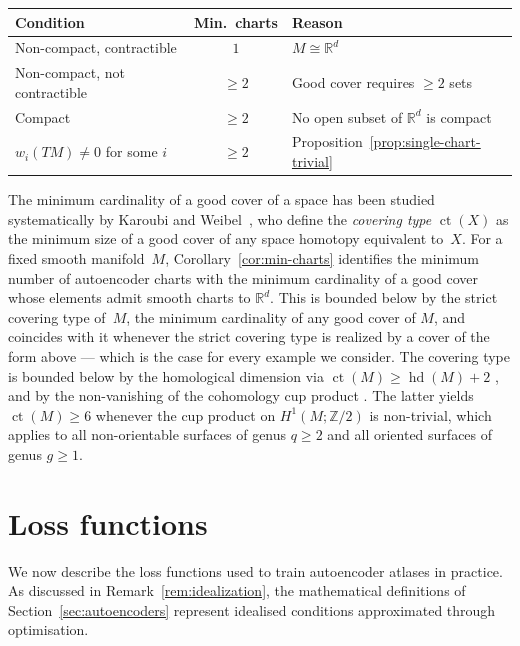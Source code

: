 \documentclass[11pt]{article}
\newcommand{\R}{\mathbb{R}}
\newcommand{\Z}{\mathbb{Z}}
\theoremstyle{plain}
\theoremstyle{definition}
\theoremstyle{remark}
\begin{document}
\begin{center}
\renewcommand{\arraystretch}{1.3}
\begin{tabular}{|l|c|l|}
\hline
\textbf{Condition} & \textbf{Min.\ charts} & \textbf{Reason} \\
\hline
Non-compact, contractible & $1$ & $M \cong \R^d$ \\
Non-compact, not contractible & $\geq 2$ & Good cover requires $\geq 2$ sets \\
Compact & $\geq 2$ & No open subset of $\R^d$ is compact \\
$w_i(TM) \neq 0$ for some $i$ & $\geq 2$ & Proposition~\ref{prop:single-chart-trivial} \\
\hline
\end{tabular}
\end{center}

The minimum cardinality of a good cover of a space has been studied systematically by Karoubi and Weibel~\cite{Karoubi2017}, who define the \emph{covering type} $\operatorname{ct}(X)$ as the minimum size of a good cover of any space homotopy equivalent to~$X$. For a fixed smooth manifold~$M$, Corollary~\ref{cor:min-charts} identifies the minimum number of autoencoder charts with the minimum cardinality of a good cover whose elements admit smooth charts to $\R^d$. This is bounded below by the strict covering type of~$M$, the minimum cardinality of any good cover of $M$, and coincides with it whenever the strict covering type is realized by a cover of the form above --- which is the case for every example we consider. The covering type is bounded below by the homological dimension via $\operatorname{ct}(M) \geq \operatorname{hd}(M) + 2$ \cite[Proposition~3.1]{Karoubi2017}, and by the non-vanishing of the cohomology cup product \cite[Proposition~5.2]{Karoubi2017}. The latter yields $\operatorname{ct}(M) \geq 6$ whenever the cup product on $H^1(M; \Z/2)$ is non-trivial, which applies to all non-orientable surfaces of genus $q \geq 2$ and all oriented surfaces of genus $g \geq 1$.

\section{Loss functions}\label{sec:loss-functions}

We now describe the loss functions used to train autoencoder atlases in practice. As discussed in Remark~\ref{rem:idealization}, the mathematical definitions of Section~\ref{sec:autoencoders} represent idealised conditions approximated through optimisation.
\end{document}
